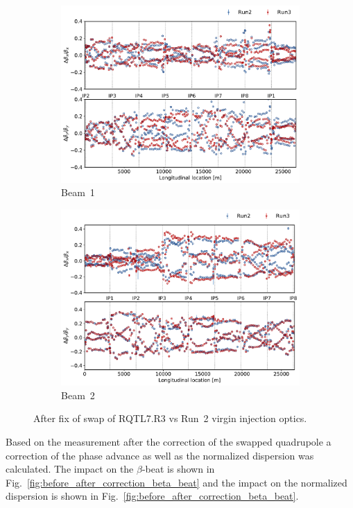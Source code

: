 \documentclass[a4paper]{cernatsnote}
\begin{document}
\begin{figure}[ht]
\begin{subfigure}{.5\textwidth}
  \centering
  \includegraphics[width=.8\linewidth]{plots/beam1/beta_beat_2016_2021_swap_fixed.pdf}   
  \caption{Beam~1}
\end{subfigure}
\begin{subfigure}{.5\textwidth}
  \centering
  \includegraphics[width=.8\linewidth]{plots/beam2/B2_BetaBeat_afterIR3Q7fix_vs_virgin2016.pdf}
  \caption{Beam~2}
\end{subfigure}
\caption{After fix of swap of RQTL7.R3 vs Run~2 virgin injection optics.}
\label{fig:after_swap_vs_2016}
\end{figure}

Based on the measurement after the correction of the swapped quadrupole a correction of the phase advance as well as the normalized dispersion was calculated. The impact on the $\beta$-beat is shown in Fig.~\ref{fig:before_after_correction_beta_beat} and the impact on the normalized dispersion is shown in Fig.~\ref{fig:before_after_correction_beta_beat}. 
\end{document}
